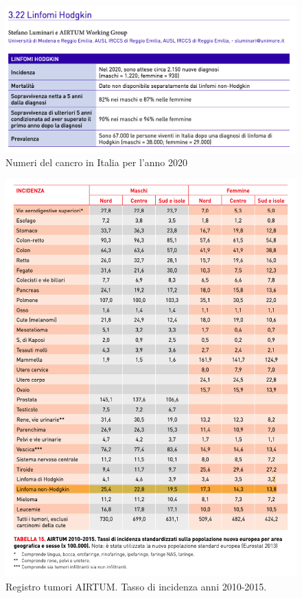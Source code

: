 \begin{figure}[h]
    \begin{center}
    \includegraphics[width=0.8\columnwidth]{img/2020.png}
    \end{center}
    \caption[Numeri del cancro in Italia per l’anno 2020]{Numeri del cancro in Italia per l’anno 2020
    \cite{img5}}

\end{figure}

\begin{figure}[h]
    \begin{center}
    \includegraphics[width=0.8\columnwidth]{img/INCIDENZA.png}
    \end{center}
    \caption[Registro tumori AIRTUM. Tasso di incidenza anni 2010-2015.]{Registro tumori AIRTUM. Tasso di incidenza anni 2010-2015.
    \cite{img6}}

\end{figure}


